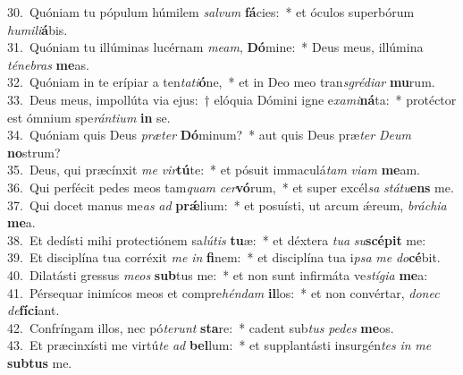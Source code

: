 {30.~}Quóniam tu pópulum húmilem \textit{sal}\textit{vum} \textbf{fá}cies:~* et óculos superbórum \textit{hu}\textit{mi}\textit{li}\textbf{á}bis.\\
{31.~}Quóniam tu illúminas lucérnam \textit{me}\textit{am}, \textbf{Dó}mine:~* Deus meus, illúmina \textit{té}\textit{ne}\textit{bras} \textbf{me}as.\\
{32.~}Quóniam in te erípiar a ten\textit{ta}\textit{ti}\textbf{ó}ne,~* et in Deo meo tran\textit{sgré}\textit{di}\textit{ar} \textbf{mu}rum.\\
{33.~}Deus meus, impollúta via ejus:~† elóquia Dómini igne e\textit{xa}\textit{mi}\textbf{ná}ta:~* protéctor est ómnium spe\textit{rán}\textit{ti}\textit{um} \textbf{in} se.\\
{34.~}Quóniam quis Deus \textit{præ}\textit{ter} \textbf{Dó}minum?~* aut quis Deus præ\textit{ter} \textit{De}\textit{um} \textbf{no}strum?\\
{35.~}Deus, qui præcínxit \textit{me} \textit{vir}\textbf{tú}te:~* et pósuit immaculá\textit{tam} \textit{vi}\textit{am} \textbf{me}am.\\
{36.~}Qui perfécit pedes meos tam\textit{quam} \textit{cer}\textbf{vó}rum,~* et super excél\textit{sa} \textit{stá}\textit{tu}\textbf{ens} me.\\
{37.~}Qui docet manus me\textit{as} \textit{ad} \textbf{prǽ}lium:~* et posuísti, ut arcum ǽreum, \textit{brá}\textit{chi}\textit{a} \textbf{me}a.\\
{38.~}Et dedísti mihi protectiónem sa\textit{lú}\textit{tis} \textbf{tu}æ:~* et déxtera \textit{tu}\textit{a} \textit{su}\textbf{scé}\textbf{pit} me:\\
{39.~}Et disciplína tua corréxit \textit{me} \textit{in} \textbf{fi}nem:~* et disciplína tua i\textit{psa} \textit{me} \textit{do}\textbf{cé}bit.\\
{40.~}Dilatásti gressus \textit{me}\textit{os} \textbf{sub}tus me:~* et non sunt infirmáta ve\textit{stí}\textit{gi}\textit{a} \textbf{me}a:\\
{41.~}Pérsequar inimícos meos et compre\textit{hén}\textit{dam} \textbf{il}los:~* et non convértar, \textit{do}\textit{nec} \textit{de}\textbf{fí}\textbf{ci}ant.\\
{42.~}Confríngam illos, nec pó\textit{te}\textit{runt} \textbf{sta}re:~* cadent sub\textit{tus} \textit{pe}\textit{des} \textbf{me}os.\\
{43.~}Et præcinxísti me virtú\textit{te} \textit{ad} \textbf{bel}lum:~* et supplantásti insurgén\textit{tes} \textit{in} \textit{me} \textbf{sub}\textbf{tus} me.\\
